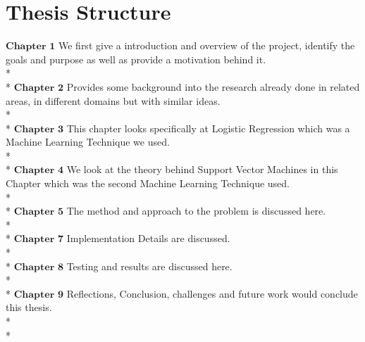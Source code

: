 \section{Thesis Structure}
$\textbf{Chapter 1}$ We first give a introduction and overview of the project, identify the goals and purpose as well as provide a motivation behind it.\\*\\*
$\textbf{Chapter 2}$ Provides some background into the research already done in related areas, in different domains but with similar ideas. \\*\\*
$\textbf{Chapter 3}$ This chapter looks specifically at Logistic Regression which was a Machine Learning Technique we used. \\*\\*
$\textbf{Chapter 4}$ We look at the theory behind Support Vector Machines in this Chapter which was the second Machine Learning Technique used. \\*\\*
$\textbf{Chapter 5}$ The method and approach to the problem is discussed here. \\*\\*
$\textbf{Chapter 7}$ Implementation Details are discussed.  \\*\\*
$\textbf{Chapter 8}$ Testing and results are discussed here.  \\*\\*
$\textbf{Chapter 9}$ Reflections, Conclusion, challenges and future work would conclude this thesis.  \\*\\*